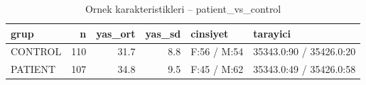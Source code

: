 \begin{table}[htbp]
  \centering
  \caption{Ornek karakteristikleri -- patient\_vs\_control}
  \label{tab:sample_patient_vs_control}
  \small
  \begin{tabular}{lrrrll}
    \toprule
    grup & n & yas\_ort & yas\_sd & cinsiyet & tarayici \\
    \midrule
    CONTROL & 110 & 31.7 & 8.8 & F:56 / M:54 & 35343.0:90 / 35426.0:20 \\
    PATIENT & 107 & 34.8 & 9.5 & F:45 / M:62 & 35343.0:49 / 35426.0:58 \\
    \bottomrule
  \end{tabular}
\end{table}
